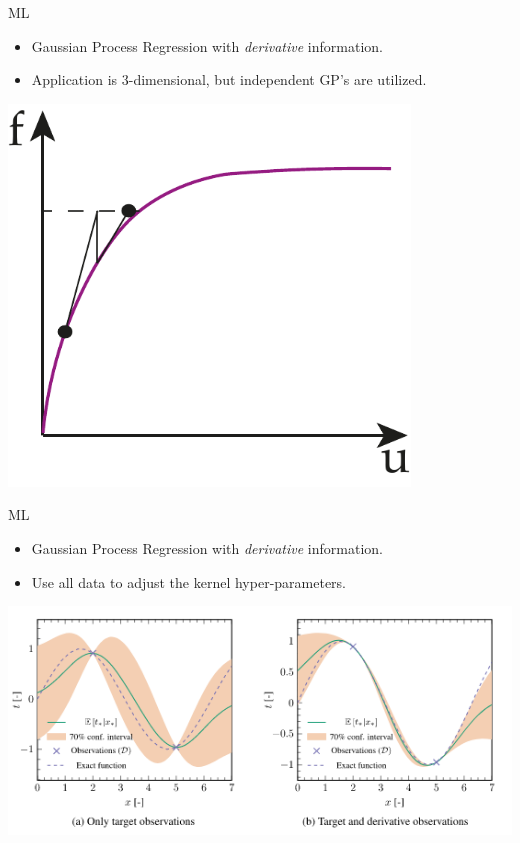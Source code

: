 \documentclass[aspectratio=169]{beamer}
\begin{document}
\begin{frame}{ML}
  \begin{minipage}{0.5\textwidth}
    \begin{itemize}
      \item Gaussian Process Regression with \textit{derivative} information.
      \item Application is 3-dimensional, but independent GP's are utilized.
    \end{itemize} 
  \end{minipage}%
  \begin{minipage}{0.5\textwidth}
    \centering
    \includegraphics[width=0.8\textwidth]{Figures/nonlinear}
  \end{minipage}
\end{frame}

\begin{frame}{ML}
  \begin{minipage}{0.5\textwidth}
    \begin{itemize}
      \item Gaussian Process Regression with \textit{derivative} information.
      \item Use all data  to adjust the kernel hyper-parameters.
    \end{itemize} 
  \end{minipage}%
  \begin{minipage}{0.5\textwidth}
    \centering
    \includegraphics[width=1.1\textwidth]{Figures/gpr_deriv}
  \end{minipage}
\end{frame}
\end{document}
